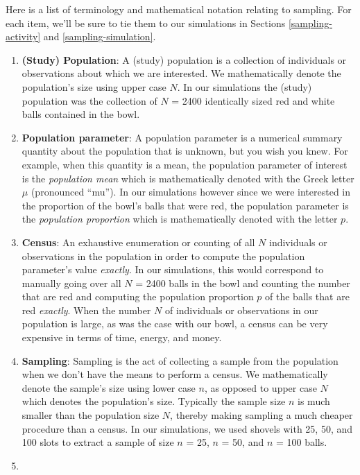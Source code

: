 \documentclass[12pt, krantz2,]{krantz}
\providecommand{\tightlist}{%
  \setlength{\itemsep}{0pt}\setlength{\parskip}{0pt}}
\begin{document}
Here is a list of terminology and mathematical notation relating to sampling. For each item, we'll be sure to tie them to our simulations in Sections \ref{sampling-activity} and \ref{sampling-simulation}.

\begin{enumerate}
\def\labelenumi{\arabic{enumi}.}
\tightlist
\item
  \textbf{(Study) Population}: A (study) population is a collection of individuals or observations about which we are interested. We mathematically denote the population's size using upper case \(N\). In our simulations the (study) population was the collection of \(N\) = 2400 identically sized red and white balls contained in the bowl.
\item
  \textbf{Population parameter}: A population parameter is a numerical summary quantity about the population that is unknown, but you wish you knew. For example, when this quantity is a mean, the population parameter of interest is the \emph{population mean} which is mathematically denoted with the Greek letter \(\mu\) (pronounced ``mu''). In our simulations however since we were interested in the proportion of the bowl's balls that were red, the population parameter is the \emph{population proportion} which is mathematically denoted with the letter \(p\).
\item
  \textbf{Census}: An exhaustive enumeration or counting of all \(N\) individuals or observations in the population in order to compute the population parameter's value \emph{exactly}. In our simulations, this would correspond to manually going over all \(N\) = 2400 balls in the bowl and counting the number that are red and computing the population proportion \(p\) of the balls that are red \emph{exactly}. When the number \(N\) of individuals or observations in our population is large, as was the case with our bowl, a census can be very expensive in terms of time, energy, and money.
\item
  \textbf{Sampling}: Sampling is the act of collecting a sample from the population when we don't have the means to perform a census. We mathematically denote the sample's size using lower case \(n\), as opposed to upper case \(N\) which denotes the population's size. Typically the sample size \(n\) is much smaller than the population size \(N\), thereby making sampling a much cheaper procedure than a census. In our simulations, we used shovels with 25, 50, and 100 slots to extract a sample of size \(n\) = 25, \(n\) = 50, and \(n\) = 100 balls.
\item

\end{enumerate}
\end{document}
